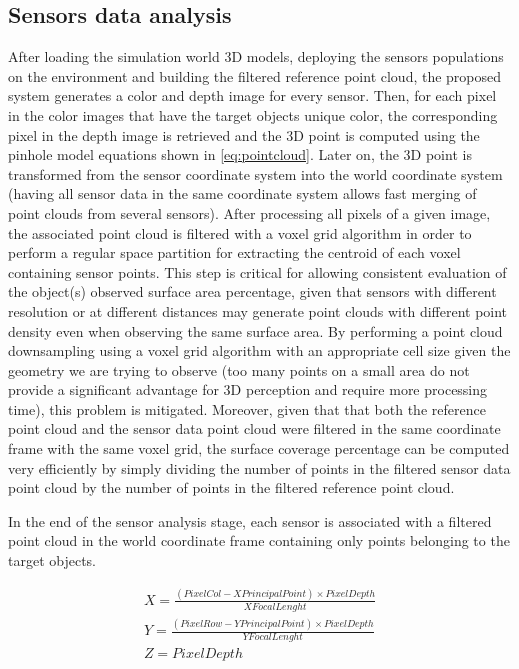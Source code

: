 \subsection{Sensors data analysis}

After loading the simulation world 3D models, deploying the sensors populations on the environment and building the filtered reference point cloud, the proposed system generates a color and depth image for every sensor. Then, for each pixel in the color images that have the target objects unique color, the corresponding pixel in the depth image is retrieved and the 3D point is computed using the pinhole model equations shown in \cref{eq:pointcloud}. Later on, the 3D point is transformed from the sensor coordinate system into the world coordinate system (having all sensor data in the same coordinate system allows fast merging of point clouds from several sensors). After processing all pixels of a given image, the associated point cloud is filtered with a voxel grid algorithm in order to perform a regular space partition for extracting the centroid of each voxel containing sensor points. This step is critical for allowing consistent evaluation of the object(s) observed surface area percentage, given that sensors with different resolution or at different distances may generate point clouds with different point density even when observing the same surface area. By performing a point cloud downsampling using a voxel grid algorithm with an appropriate cell size given the geometry we are trying to observe (too many points on a small area do not provide a significant advantage for 3D perception and require more processing time), this problem is mitigated. Moreover, given that that both the reference point cloud and the sensor data point cloud were filtered in the same coordinate frame with the same voxel grid, the surface coverage percentage can be computed very efficiently by simply dividing the number of points in the filtered sensor data point cloud by the number of points in the filtered reference point cloud.

In the end of the sensor analysis stage, each sensor is associated with a filtered point cloud in the world coordinate frame containing only points belonging to the target objects.

\footnotesize
\begin{equation}\label{eq:pointcloud}
	\begin{split}
		X = \frac{(PixelCol - XPrincipalPoint) \times PixelDepth}{XFocalLenght}\\
		Y = \frac{(PixelRow - YPrincipalPoint) \times PixelDepth}{YFocalLenght}\\
		Z = PixelDepth
	\end{split}
\end{equation}
\normalsize

